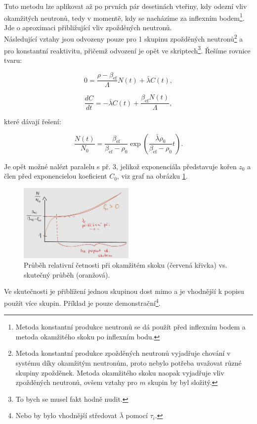Tuto metodu lze aplikovat až po prvních pár desetinách vteřiny, kdy odezní vliv okamžitých neutronů, tedy v momentě, kdy se nacházíme za inflexním bodem\footnote{Metoda konstantní produkce neutronů se dá použít před inflexním bodem a metoda okamžitého skoku po inflexním bodu.}. Jde o aproximaci přibližující vliv zpožděných neutronů.\\

Následující vztahy jsou odvozeny pouze pro 1 skupinu zpožděných neutronů\footnote{Metoda konstantní produkce zpožděných neutronů vyjadřuje chování v systému díky okamžitým neutronům, proto nebylo potřeba uvažovat různé skupiny zpožděnek. Metoda okamžitého skoku naopak vyjadřuje vliv zpožděných neutronů, ovšem vztahy pro $m$ skupin by byl složitý.} a pro konstantní reaktivitu, přičemž odvození je opět ve skriptech\footnote{To bych se musel fakt hodně nudit.}. Řešíme rovnice tvaru:

$$ 0 = \dfrac{\rho - \beta_{\text{ef}}}{\Lambda} N(t) + \bar{\lambda} C(t), $$

$$ \dfrac{dC}{dt} = -\bar{\lambda} C(t) + \dfrac{\beta_{\text{ef}}  N(t)}{\Lambda}, $$

které dávají řešení:

$$ \dfrac{N(t)}{N_0} = \dfrac{\beta_{\text{ef}}}{\beta_{\text{ef}} - \rho_0} \exp{\left ( \dfrac{\bar{\lambda} \rho_0}{\beta_{\text{ef}} - \rho_0} t \right )}. $$

Je opět možné nalézt paralelu s př. 3, jelikož exponenciála představuje kořen $z_0$ a člen před exponencielou koeficient $C_0$, viz graf na obrázku \ref{fig_okamzity_skok}.

\begin{figure}[H]
  \centering
  \includegraphics[width=0.5\textwidth]{img/okamzity_skok.jpg}
  \caption{Průběh relativní četnosti při okamžitém skoku (červená křivka) vs. skutečný průběh (oranžová).}
  \label{fig_okamzity_skok}
\end{figure}

Ve skutečnosti je přiblížení jednou skupinou dost mimo a je vhodnější k popisu použít více skupin. Příklad je pouze demonstrační\footnote{Nebo by bylo vhodnější středovat $\bar{\lambda}$ pomocí $\tau_i$.}.\\

